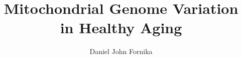 \documentclass[
 fogscopy,
 onehalfspacing,
 11pt
 ]{ubcdiss}
\title{Mitochondrial Genome Variation in Healthy Aging}
\author{Daniel John Fornika}
\begin{document}
 
\maketitle
 

\cleardoublepage
 
\acresetall     %
 

\cleardoublepage
 
\tableofcontents
\cleardoublepage        %
 
\listoftables
\cleardoublepage        %
 
\listoffigures
\cleardoublepage        %
 
 
 
\textspacing            %
 
% 
 
 
\mainmatter
 
\acresetall     %
 

 



 
 
\end{document}
